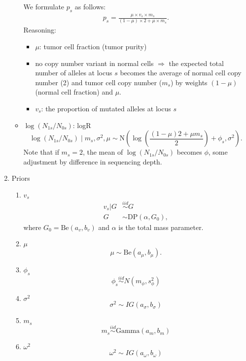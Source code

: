 \documentclass[12pt]{article}
\newcommand{\Be}{\mbox{Be}}
\newcommand{\Nor}{\mbox{N}}
\newcommand{\iid}{\stackrel{iid}{\sim}}
\begin{document}
\begin{enumerate}
\begin{itemize}
We formulate $p_s$ as follows:
\begin{eqnarray*}
p_s =\frac{\mu \times v_s  \times m_s}{(1-\mu)\times 2 + \mu \times m_s}.
\end{eqnarray*}
Reasoning:  
\begin{itemize}
\item $\mu$: tumor cell fraction (tumor purity)
\item no copy number variant in normal cells  $\Rightarrow$ the expected total number of alleles at locus $s$ becomes the average of normal cell copy number (2) and  tumor cell copy number ($m_s$) by weights $(1-\mu)$ (normal cell fraction) and $\mu$.
\item $v_s$: the proportion of mutated alleles at locus $s$
\end{itemize}

\item $\log(N_{1s}/N_{0s})$: logR
$$
\log(N_{1s}/N_{0s}) \mid m_s, \sigma^2, \mu \sim \Nor\left(\log\left(\frac{(1-\mu)2 + \mu m_s}{2}\right) + \phi_s, \sigma^2\right).
$$
Note that if $m_s=2$, the mean of $\log(N_{1s}/N_{0s})$ becomes $\phi$, some adjustment by difference in sequencing depth. 
\end{itemize}





\item Priors
\begin{enumerate}
\item $v_s$
\begin{align*}
  v_s | G &\iid G \\
  G &\sim \text{DP}(\alpha,G_0),
\end{align*}
where $G_0 = \Be(a_v, b_v)$ and $\alpha$ is the total mass parameter.

\item $\mu$
$$
\mu \sim \Be(a_\mu, b_\mu).
$$

\item $\phi_s$
  $$
  \phi_s \iid N(m_\phi, s^2_\phi)
  $$

\item $\sigma^2$
  $$
  \sigma^2 \sim IG(a_\sigma,b_\sigma)
  $$

\item $m_s$
  $$
  m_s \iid \text{Gamma}(a_m,b_m)
  $$

\item $\omega^2$
  $$
  \omega^2 \sim IG(a_\omega,b_\omega)
  $$

\end{enumerate}
\end{enumerate}
\end{document}
